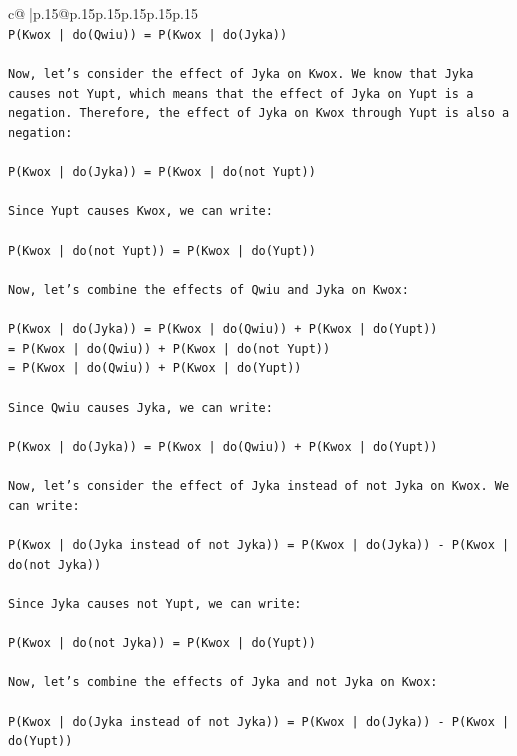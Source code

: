 \documentclass{article}
\begin{document}
{\begin{supertabular}{c@{$\;$}|p{.15\linewidth}@{}p{.15\linewidth}p{.15\linewidth}p{.15\linewidth}p{.15\linewidth}p{.15\linewidth}}
{{{\\ 
\texttt{P(Kwox | do(Qwiu)) = P(Kwox | do(Jyka))} \\
\\ 
\texttt{Now, let's consider the effect of Jyka on Kwox. We know that Jyka causes not Yupt, which means that the effect of Jyka on Yupt is a negation. Therefore, the effect of Jyka on Kwox through Yupt is also a negation:} \\
\\ 
\texttt{P(Kwox | do(Jyka)) = P(Kwox | do(not Yupt))} \\
\\ 
\texttt{Since Yupt causes Kwox, we can write:} \\
\\ 
\texttt{P(Kwox | do(not Yupt)) = P(Kwox | do(Yupt))} \\
\\ 
\texttt{Now, let's combine the effects of Qwiu and Jyka on Kwox:} \\
\\ 
\texttt{P(Kwox | do(Jyka)) = P(Kwox | do(Qwiu)) + P(Kwox | do(Yupt))} \\
\texttt{= P(Kwox | do(Qwiu)) + P(Kwox | do(not Yupt))} \\
\texttt{= P(Kwox | do(Qwiu)) + P(Kwox | do(Yupt))} \\
\\ 
\texttt{Since Qwiu causes Jyka, we can write:} \\
\\ 
\texttt{P(Kwox | do(Jyka)) = P(Kwox | do(Qwiu)) + P(Kwox | do(Yupt))} \\
\\ 
\texttt{Now, let's consider the effect of Jyka instead of not Jyka on Kwox. We can write:} \\
\\ 
\texttt{P(Kwox | do(Jyka instead of not Jyka)) = P(Kwox | do(Jyka)) {-} P(Kwox | do(not Jyka))} \\
\\ 
\texttt{Since Jyka causes not Yupt, we can write:} \\
\\ 
\texttt{P(Kwox | do(not Jyka)) = P(Kwox | do(Yupt))} \\
\\ 
\texttt{Now, let's combine the effects of Jyka and not Jyka on Kwox:} \\
\\ 
\texttt{P(Kwox | do(Jyka instead of not Jyka)) = P(Kwox | do(Jyka)) {-} P(Kwox | do(Yupt))} \\
}}}
\end{supertabular}}
\end{document}

